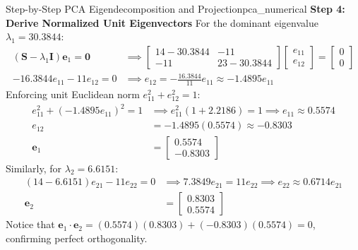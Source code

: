 \begin{example}{Step-by-Step PCA Eigendecomposition and Projection}{pca_numerical}
\textbf{Step 4: Derive Normalized Unit Eigenvectors}
For the dominant eigenvalue $\lambda_1 = 30.3844$:
\begin{align*}
    (\mathbf{S} - \lambda_1 \mathbf{I})\mathbf{e}_1 = \mathbf{0} &\implies \begin{bmatrix}
    14 - 30.3844 & -11 \\
    -11 & 23 - 30.3844
    \end{bmatrix} \begin{bmatrix} e_{11} \\ e_{12} \end{bmatrix} = \begin{bmatrix} 0 \\ 0 \end{bmatrix} \\[4pt]
    -16.3844 e_{11} - 11 e_{12} = 0 &\implies e_{12} = -\frac{16.3844}{11} e_{11} \approx -1.4895 e_{11}
\end{align*}
Enforcing unit Euclidean norm $e_{11}^2 + e_{12}^2 = 1$:
\begin{align*}
    e_{11}^2 + (-1.4895 e_{11})^2 = 1 &\implies e_{11}^2 (1 + 2.2186) = 1 \implies e_{11} \approx 0.5574 \\[4pt]
    e_{12} &= -1.4895(0.5574) \approx -0.8303 \\[4pt]
    \mathbf{e}_1 &= \begin{bmatrix} 0.5574 \\ -0.8303 \end{bmatrix}
\end{align*}
Similarly, for $\lambda_2 = 6.6151$:
\begin{align*}
    (14 - 6.6151) e_{21} - 11 e_{22} = 0 &\implies 7.3849 e_{21} = 11 e_{22} \implies e_{22} \approx 0.6714 e_{21} \\[4pt]
    \mathbf{e}_2 &= \begin{bmatrix} 0.8303 \\ 0.5574 \end{bmatrix}
\end{align*}
Notice that $\mathbf{e}_1 \cdot \mathbf{e}_2 = (0.5574)(0.8303) + (-0.8303)(0.5574) = 0$, confirming perfect orthogonality.


\end{example}
